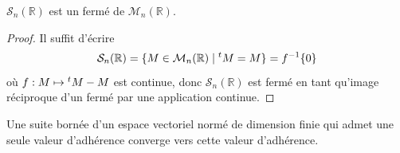 





  \begin{lemma}
    \label{homeomorphisme-de-l-exponentielle-1}
    $\mathcal{S}_n(\mathbb{R})$ est un fermé de $\mathcal{M}_n(\mathbb{R})$.
  \end{lemma}

  \begin{proof}
    Il suffit d'écrire
    \[ \mathcal{S}_n(\mathbb{R}) = \{ M \in \mathcal{M}_n(\mathbb{R}) \mid \mathstrut ^t M = M \} = f^{-1}\{ 0 \} \]
    où $f : M \mapsto \mathstrut ^t M - M$ est continue, donc $\mathcal{S}_n(\mathbb{R})$ est fermé en tant qu'image réciproque d'un fermé par une application continue.
  \end{proof}

  \begin{lemma}
    \label{homeomorphisme-de-l-exponentielle-2}
    Une suite bornée d'un espace vectoriel normé de dimension finie qui admet une seule valeur d'adhérence converge vers cette valeur d'adhérence.
  \end{lemma}

